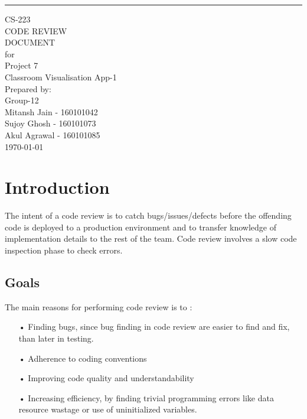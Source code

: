 \documentclass{scrreprt}
\date{}
\title{}
\begin{document}
\begin{flushright}
    \rule{16cm}{5pt}\vskip1cm
    \begin{bfseries}
        \Huge{CS-223\\CODE REVIEW\\ DOCUMENT\\}
        \vspace{1.5cm}
        for\\
        \vspace{1.5cm}
        Project 7\\
        Classroom Visualisation App-1\\
        
        \vspace{1.9cm}
        \LARGE{Prepared by: }\\
        Group-12\\
        Mitansh Jain - 160101042\\
        Sujoy Ghosh - 160101073\\
        Akul Agrawal - 160101085\\
        \vspace{1.9cm}
        \today\\
    \end{bfseries}
\end{flushright}
\tableofcontents

\chapter{Introduction}
The intent of a code review is to catch bugs/issues/defects before the
offending code is deployed to a production environment and to transfer
knowledge of implementation details to the rest of the team. Code
review involves a slow code inspection phase to check errors.

\section{Goals}
The main reasons for performing code review is to :
\begin{itemize}
\item[•] Finding bugs, since bug finding in code review are easier to find and fix, than later in testing.
\item[•] Adherence to coding conventions
\item[•] Improving code quality and understandability
\item[•] Increasing efficiency, by finding trivial programming errors like data resource wastage or use of uninitialized variables.
\end{itemize}
\end{document}
